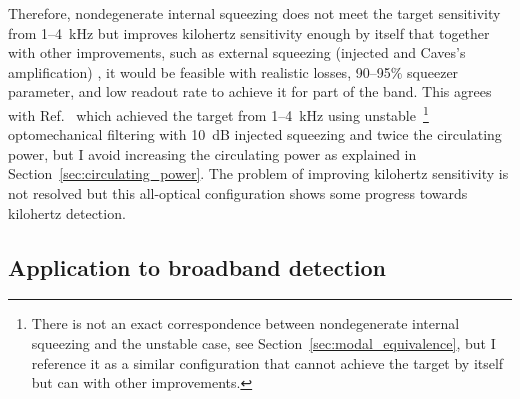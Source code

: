 Therefore, nondegenerate internal squeezing does not meet the target sensitivity from 1--4~kHz but improves kilohertz sensitivity enough by itself that together with other improvements, such as external squeezing (injected and Caves's amplification) , it would be feasible with realistic losses, 90--95$\%$ squeezer parameter, and low readout rate  to achieve it for part of the band. This agrees with Ref.~\cite{Miao2018} which achieved the target from 1--4~kHz using unstable~\footnote{There is not an exact correspondence between nondegenerate internal squeezing and the unstable case, see Section~\ref{sec:modal_equivalence}, but I reference it as a similar configuration that cannot achieve the target by itself but can with other improvements.} optomechanical filtering with 10~dB injected squeezing and twice the circulating power, but I avoid increasing the circulating power as explained in Section~\ref{sec:circulating_power}. The problem of improving kilohertz sensitivity is not resolved but this all-optical configuration shows some progress towards kilohertz detection.


\subsection{Application to broadband detection}


